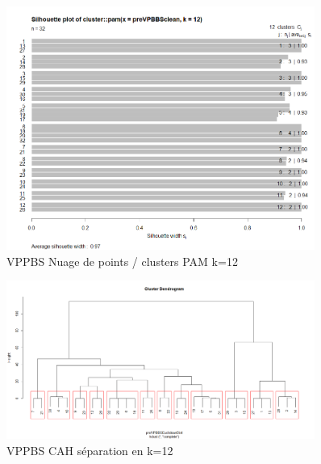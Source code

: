 \begin{figure}[H]
\centering
\includegraphics[width=0.90\textwidth]{../Fig/VPPBS/vppbs-sil-k12-pre.png}
\caption{VPPBS Nuage de points / clusters PAM k=12 }
\end{figure}

\begin{figure}[H]
\centering
\includegraphics[width=0.90\textwidth]{../Fig/VPPBS/vppbs-cah-k12-pre.png}
\caption{VPPBS CAH séparation en k=12 }
\end{figure}


%
%











%
